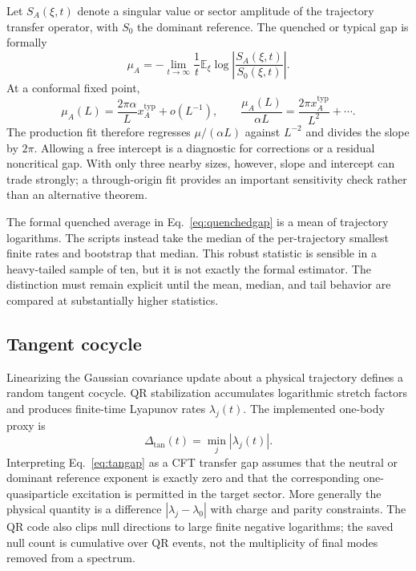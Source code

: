 \documentclass[aps,prb,onecolumn,nofootinbib,superscriptaddress]{revtex4-2}
\newcommand{\E}{\mathbb{E}}
\begin{document}
Let $S_A(\xi,t)$ denote a singular value or sector amplitude of the trajectory transfer
operator, with $S_0$ the dominant reference.  The quenched or typical gap is formally
\begin{equation}
 \mu_A=-\lim_{t\to\infty}\frac{1}{t}
 \E_\xi\log\left|\frac{S_A(\xi,t)}{S_0(\xi,t)}\right|.
 \label{eq:quenchedgap}
\end{equation}
At a conformal fixed point,
\begin{equation}
 \mu_A(L)=\frac{2\pi\alpha}{L}x_A^{\mathrm{typ}}+o(L^{-1}),
 \qquad
 \frac{\mu_A(L)}{\alpha L}=\frac{2\pi x_A^{\mathrm{typ}}}{L^2}+\cdots .
 \label{eq:xfit}
\end{equation}
The production fit therefore regresses $\mu/(\alpha L)$ against $L^{-2}$ and divides the
slope by $2\pi$.  Allowing a free intercept is a diagnostic for corrections or a residual
noncritical gap.  With only three nearby sizes, however, slope and intercept can trade
strongly; a through-origin fit provides an important sensitivity check rather than an
alternative theorem.

The formal quenched average in Eq.~\eqref{eq:quenchedgap} is a mean of trajectory logarithms.
The scripts instead take the median of the per-trajectory smallest finite rates and
bootstrap that median.  This robust statistic is sensible in a heavy-tailed sample of ten,
but it is not exactly the formal estimator.  The distinction must remain explicit until
the mean, median, and tail behavior are compared at substantially higher statistics.

\subsection{Tangent cocycle}

Linearizing the Gaussian covariance update about a physical trajectory defines a random
tangent cocycle.  QR stabilization accumulates logarithmic stretch factors and produces
finite-time Lyapunov rates $\lambda_j(t)$.  The implemented one-body proxy is
\begin{equation}
 \Delta_{\mathrm{tan}}(t)=\min_j|\lambda_j(t)|.
 \label{eq:tangap}
\end{equation}
Interpreting Eq.~\eqref{eq:tangap} as a CFT transfer gap assumes that the neutral or dominant
reference exponent is exactly zero and that the corresponding one-quasiparticle excitation
is permitted in the target sector.  More generally the physical quantity is a difference
$|\lambda_j-\lambda_0|$ with charge and parity constraints.  The QR code also clips null
directions to large finite negative logarithms; the saved null count is cumulative over QR
events, not the multiplicity of final modes removed from a spectrum.
\end{document}

